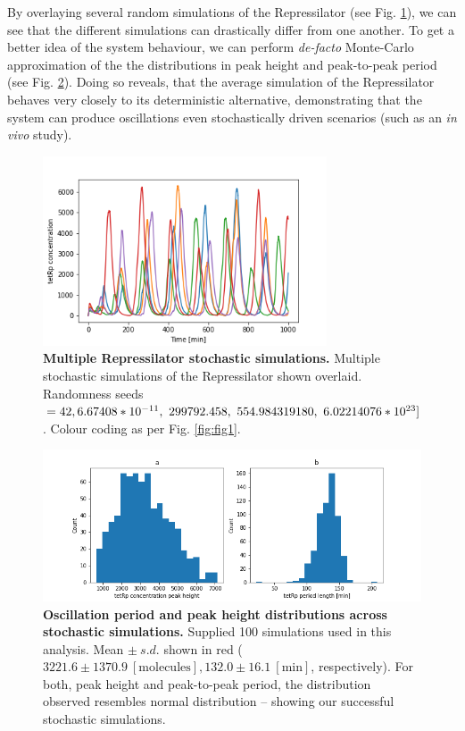 \documentclass[runningheads,a4paper]{llncs}
\begin{document}
By overlaying several random simulations of the Repressilator (see Fig. \ref{fig:fig18}), we can see that  the different simulations can drastically differ from one another. To get a better idea of the system behaviour, we can perform \textit{de-facto} Monte-Carlo approximation of the the distributions in peak height and peak-to-peak period (see Fig. \ref{fig:fig19}). Doing so reveals, that the average simulation of the Repressilator behaves very closely to its deterministic alternative, demonstrating that the system can produce oscillations even stochastically driven scenarios (such as an \textit{in vivo} study).

\begin{figure}
    \singlespacing
    \centering
    \includegraphics[width=0.75\textwidth]{suplementary_information_and_code/Task6_figure2.png}
    \caption{\textbf{Multiple Repressilator stochastic simulations.} Multiple stochastic simulations of the Repressilator shown overlaid. Randomness seeds $= 42,\linebreak 6.67408*10^{-11},\ 299792.458,\ 554.984319180,\ 6.02214076*10^{23}]$. Colour coding as per Fig. \ref{fig:fig1}.}
    \label{fig:fig18}
\end{figure}

\begin{figure}
    \singlespacing
    \centering
    \includegraphics[width=1\textwidth]{suplementary_information_and_code/Task6_figure3.png}
    \caption{\textbf{Oscillation period and peak height distributions across stochastic simulations.} Supplied 100 simulations used in this analysis. Mean $\pm\ s.d.$ shown in red ($3221.6 \pm 1370.9\ [\textrm{molecules}], 132.0 \pm 16.1\ [\textrm{min}]$, respectively). For both, peak height and peak-to-peak period, the distribution observed resembles normal distribution -- showing our successful stochastic simulations.}
    \label{fig:fig19}
\end{figure}
\end{document}

